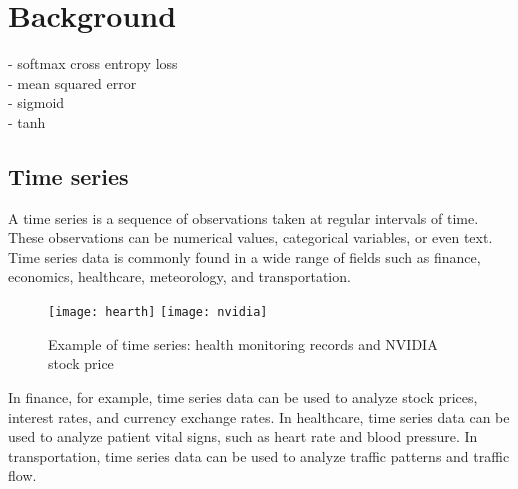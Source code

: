 \chapter{Background}

- softmax cross entropy loss\\
- mean squared error\\
- sigmoid\\
- tanh

\section{Time series}
A time series is a sequence of observations taken at regular intervals of time.
These observations can be numerical values, categorical variables, or even text.
Time series data is commonly found in a wide range of fields such as finance, economics, healthcare, meteorology, and transportation.

\begin{figure}[H]
  \centering
  \texttt{[image: hearth]}
  \texttt{[image: nvidia]}
  \caption{Example of time series: health monitoring records \cite{influxdata} and NVIDIA stock price \cite{finance}}
\end{figure}

In finance, for example, time series data can be used to analyze stock prices, interest rates, and currency exchange rates.
In healthcare, time series data can be used to analyze patient vital signs, such as heart rate and blood pressure.
In transportation, time series data can be used to analyze traffic patterns and traffic flow.



